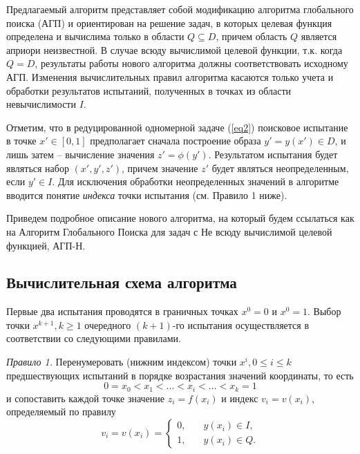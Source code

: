 \documentclass[10pt,a4paper]{book}
\begin{document}
Предлагаемый алгоритм представляет собой модификацию алгоритма глобального поиска (АГП) и ориентирован на решение задач, в которых целевая функция определена и вычислима только в области $Q \subseteq D$, причем область $Q$ является априори неизвестной. В случае всюду вычислимой целевой функции, т.к. когда $Q=D$, результаты работы нового алгоритма должны соответствовать исходному АГП. Изменения вычислительных правил алгоритма касаются только учета и обработки результатов испытаний, полученных в точках из области невычислимости $I$. 

Отметим, что в редуцированной одномерной задаче (\ref{eq2}) поисковое испытание в точке $x' \in [0,1]$ предполагает сначала построение образа $y' = y(x') \in D$, и лишь затем -- вычисление значения $z'=\phi(y')$. Результатом испытания будет являться набор $(x',y',z')$, причем значение $z'$ будет являться неопределенным, если $y' \in I$. Для исключения обработки неопределенных значений в алгоритме вводится понятие \textit{индекса} точки испытания (см. Правило 1 ниже).

Приведем подробное описание нового алгоритма, на который будем ссылаться как на Алгоритм Глобального Поиска для задач с Не всюду вычислимой целевой функцией, АГП-Н.

\subsection{Вычислительная схема алгоритма}

Первые два испытания проводятся в граничных точках $x^0=0$ и $x^0=1$.
Выбор точки $x^{k+1}, k \geq 1$ очередного $(k+1)$-го испытания осуществляется в соответствии со следующими правилами.

\textit{Правило 1.} Перенумеровать (нижним индексом) точки $x^i, 0 \leq i \leq k$ предшествующих испытаний в порядке возрастания значений координаты, то есть
\begin{equation}\label{eq5} 
0=x_0 < x_1 < ... < x_i < ... < x_{k}=1
\end{equation}
и сопоставить каждой точке значение $z_i=f(x_i)$ и индекс $v_i=v(x_i)$, определяемый по правилу
\begin{equation}\label{eq6} 
v_i=v(x_i)=
  \begin{cases}
    0, & {\quad y(x_i) \in I },\\
    1, & {\quad y(x_i) \in Q}.
  \end{cases}
\end{equation}
\end{document}
